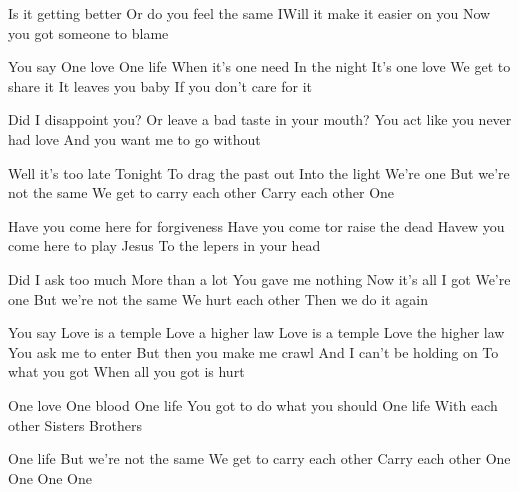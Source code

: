 \lyrics%

Is it getting better
Or do you feel the same
IWill it make it easier on you
Now you got someone to blame

You say
One love
One life
When it's one need
In the night
It's one love
We get to share it
It leaves you baby
If you don't care for it

Did I disappoint you?
Or leave a bad taste in your mouth?
You act like you never had love
And you want me to go without

Well it's too late
Tonight
To drag the past out
Into the light
We're one
But we're not the same
We get to carry each other
Carry each other
One

Have you come here for forgiveness
Have you come tor raise the dead
Havew you come here to play Jesus
To the lepers in your head

\continue
Did I ask too much
More than a lot
You gave me nothing
Now it's all I got
We're one
But we're not the same
We hurt each other
Then we do it again

You say
Love is a temple
Love a higher law
Love is a temple
Love the higher law
You ask me to enter
But then you make me crawl
And I can't be holding on
To what you got
When all you got is hurt

One love
One blood
One life
You got to do what you should
One life
With each other
Sisters
Brothers

One life
But we're not the same
We get to carry each other
Carry each other
One
One
One
One
\next